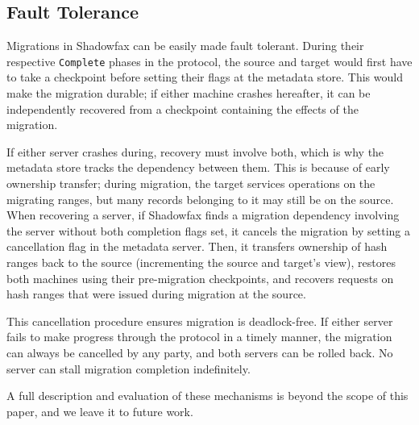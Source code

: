 \subsection{Fault Tolerance}
\label{sec:fault-tolerance}

Migrations in Shadowfax can be easily made fault tolerant.
%
During their
respective \texttt{Complete} phases in the protocol,
the source and target would first have to take a checkpoint before
setting their flags at the metadata store.
%
This would make the migration durable;
%
if either machine crashes hereafter, it can be independently recovered
from a checkpoint containing the effects of the migration.

If either server crashes during, recovery must involve both, which is why the
metadata store tracks the dependency between them.
%
This is because of early ownership transfer; during migration, the
target services operations on the migrating ranges, but many records belonging
to it may still be on the source.
%
When recovering a server, if Shadowfax finds a migration dependency
involving the server without both completion flags set, it cancels the
migration by setting a cancellation flag in the metadata server.
%
Then, it transfers ownership of hash ranges back to the source
(incrementing the source and target's view), restores both machines using
their pre-migration checkpoints, and recovers requests on hash
ranges that were issued during migration at the source.

This cancellation procedure ensures migration is deadlock-free.
%
If either server fails to make progress through the protocol
in a timely manner, the migration can always be cancelled by any party, and
both servers can be rolled back.
%
No server can stall migration completion indefinitely.

A full description and evaluation of these mechanisms is beyond the scope of
this paper, and we leave it to future work.

%
%
%
